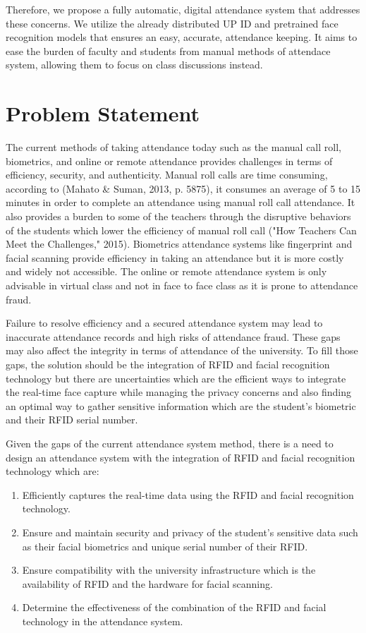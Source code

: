Therefore, we propose a fully automatic, digital attendance system that addresses these concerns. We utilize the already distributed UP ID and pretrained face recognition models that ensures an easy, accurate, attendance keeping. It aims to ease the burden of faculty and students from manual methods of attendace system, allowing them to focus on class discussions instead.

\section{Problem Statement}
The current methods of taking attendance today such as the manual call roll, biometrics, and online or remote attendance provides challenges in terms of efficiency, security, and authenticity. Manual roll calls are time consuming, according to (Mahato \& Suman, 2013, p. 5875), it consumes an average of 5 to 15 minutes in order to complete an attendance using manual roll call attendance. It also provides a burden to some of the teachers through the disruptive behaviors of the students which lower the efficiency of manual roll call ("How Teachers Can Meet the Challenges," 2015). Biometrics attendance systems like fingerprint and facial scanning provide efficiency in taking an attendance but it is more costly and widely not accessible. The online or remote attendance system is only advisable in virtual class and not in face to face class as it is prone to attendance fraud.

Failure to resolve efficiency and a secured attendance system may lead to inaccurate attendance records and high risks of attendance fraud. These gaps may also affect the integrity in terms of attendance of the university. To fill those gaps, the solution should be the integration of RFID and facial recognition technology but there are uncertainties which are the efficient ways to integrate the real-time face capture while  managing the privacy concerns and also finding an optimal way to gather sensitive information which are the student’s biometric and their RFID serial number. 

Given the gaps of the current attendance system method, there is a need to design an attendance system with the integration of RFID and facial recognition technology which are:

\begin{enumerate}
	\item Efficiently captures the real-time data using the RFID and facial recognition technology.
	\item  Ensure and maintain security and privacy of the student’s sensitive data such as their facial biometrics and unique serial number of their RFID.  
	\item Ensure compatibility with the university infrastructure which is the availability of RFID and the hardware for facial scanning. 
	\item 	Determine the effectiveness of the combination of the RFID and facial technology in the attendance system. 
\end{enumerate}


